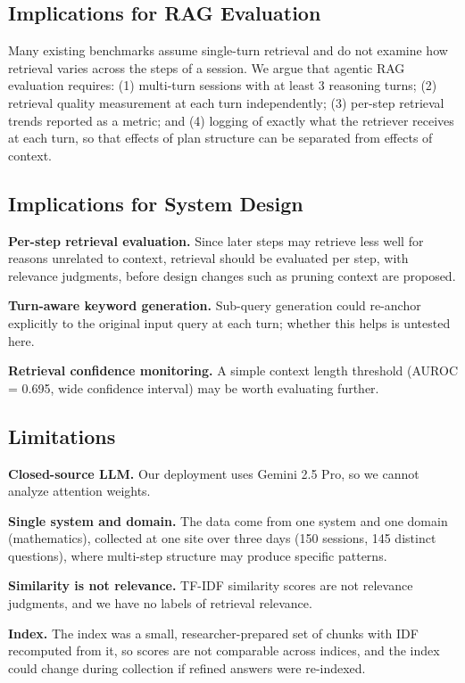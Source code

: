 \documentclass[11pt,a4paper]{article}
\begin{document}
\subsection{Implications for RAG Evaluation}
Many existing benchmarks assume single-turn retrieval and do not examine how retrieval varies across the
steps of a session. We argue that agentic RAG evaluation requires: (1) multi-turn sessions with at least 3
reasoning turns; (2) retrieval quality measurement at each turn independently; (3) per-step retrieval trends
reported as a metric; and (4) logging of exactly what the retriever receives at each turn, so that effects of plan
structure can be separated from effects of context.

\subsection{Implications for System Design}
\textbf{Per-step retrieval evaluation.} Since later steps may retrieve less well for reasons unrelated to context,
retrieval should be evaluated per step, with relevance judgments, before design changes such as pruning
context are proposed.

\textbf{Turn-aware keyword generation.} Sub-query generation could re-anchor explicitly to the original input
query at each turn; whether this helps is untested here.

\textbf{Retrieval confidence monitoring.} A simple context length threshold (AUROC = 0.695, wide confidence
interval) may be worth evaluating further.

\subsection{Limitations}
\textbf{Closed-source LLM.} Our deployment uses Gemini 2.5 Pro, so we cannot analyze attention weights.

\textbf{Single system and domain.} The data come from one system and one domain (mathematics), collected at
one site over three days (150 sessions, 145 distinct questions), where multi-step structure may produce specific
patterns.

\textbf{Similarity is not relevance.} TF-IDF similarity scores are not relevance judgments, and we have no labels
of retrieval relevance.

\textbf{Index.} The index was a small, researcher-prepared set of chunks with IDF recomputed from it, so scores
are not comparable across indices, and the index could change during collection if refined answers were
re-indexed.
\end{document}
